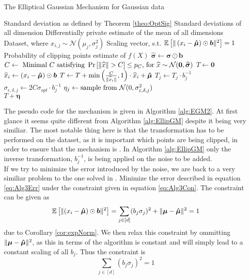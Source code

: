 \documentclass[a4paper,12pt]{article}
\newcommand{\Desc}[2]{\State \makebox[6em][l]{#1}#2}
\begin{document}
\begin{algorithm}
\caption{The Elliptical Gaussian Mechanism for Gaussian data}\label{alg:EGM2}
\begin{algorithmic}
    \Input
    \Desc{$\sigma_{opt} \in \R$}{Standard deviation as defined by Theorem \ref{theo:OptSig}}
    \Desc{$\bm{\sigma} \in \R^{d}$}{Standard deviations of all dimension}
    \Desc{$\bm{\hat{\mu}} \in \R^{d}$}{Differentially private estimate of the mean of all dimensions}
    \Desc{$X \in \R^{n \times d}$}{Dataset, where $x_{i,j} \sim \mathcal{N}(\mu_j,\sigma_j^2)$}
    \Desc{$\bm{b} \in \R^{d}$}{Scaling vector, s.t. $\ee{\lr{x_i - \bm{\hat{\mu}}} \odot \bm{b}} = 1$}
    \Desc{$p_C \in \R$}{Probability of clipping points}
    \EndInput
    \Output
    \State \edp estimate of $f(X)$
    \EndOutput
    \State $\widehat{\bm{\sigma}} \gets \bm{\sigma} \odot \bm{b}$
    \State $C \gets \textnormal{ Minimal $C$ satisfying } \prob{\|\widehat{x}\| > C} \le p_C \textnormal{, for } \widehat{x} \sim \mathcal{N}(\bm{0},\widehat{\bm{\sigma}})$
    \State $T \gets \bm{0}$
        \State $\widehat{x}_i \gets \lr{x_i - \bm{\hat{\mu}}} \odot \bm{b}$
        \State $T \gets T + \min \lr{\frac{C}{\|\widehat{x}_i\|}, 1} \cdot \widehat{x}_i + \bm{\hat{\mu}}$
    \EndFor
        \State $T_j \gets T_j \cdot b_j^{-1}$
        \State $\sigma_{\epsilon, \delta, j} \gets 2C\sigma_{opt} \cdot b_j^{-1}$
        \State $\eta_j \gets \textnormal{sample from } \mathcal{N}(0, \sigma_{\epsilon, \delta, j}^2)$
    \EndFor \\
    \Return $T + \bm{\eta}$
\end{algorithmic}
\end{algorithm}
The pseudo code for the mechanism is given in Algorithm \ref{alg:EGM2}. At first glance it seems quite different from Algorithm \ref{alg:EllipGM}
despite it being very similiar. The most notable thing here
is that the transformation has to be performed on the dataset,
as it is important which points are being clipped, in order to ensure that the mechanism is \edp.
In Algorithm \ref{alg:EllipGM} only the inverse transformation, $b_j^{-1}$, is being
applied on the noise to be added. \\

\noindent If we try to minimize the error introduced by the noise, we are back to a very similiar problem to the one solved in \cite{Lebeda2022}. 
Minimize the error described in equation \eqref{eq:Alg3Err}
under the constraint given in equation \eqref{eq:Alg3Con}.
The constraint can be given as
\begin{equation*}
    \ee{(x_i - \mue) \odot \bm{b}} = \sum_{j \in [d]} (b_j\sigma_j)^2 + \| \bm{\mu} - \mue \|^2 = 1
\end{equation*}
due to Corollary \ref{cor:expNorm}. We then relax this constraint by ommitting $\| \bm{\mu} - \mue \|^2$, 
as this in terms of the algorithm is constant and will simply lead to a constant scaling of all $b_j$.
Thus the constraint is
\begin{equation}
\label{eq:normcon}
\sum_{j \in [d]} (b_j\sigma_j)^2 = 1
\end{equation}
\end{document}
